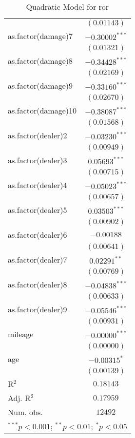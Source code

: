 \begin{table}
\begin{center}
\begin{tabular}{l c}
                    & $(0.01143)$      \\
as.factor(damage)7  & $-0.30002^{***}$ \\
                    & $(0.01321)$      \\
as.factor(damage)8  & $-0.34428^{***}$ \\
                    & $(0.02169)$      \\
as.factor(damage)9  & $-0.33160^{***}$ \\
                    & $(0.02670)$      \\
as.factor(damage)10 & $-0.38087^{***}$ \\
                    & $(0.01568)$      \\
as.factor(dealer)2  & $-0.03230^{***}$ \\
                    & $(0.00949)$      \\
as.factor(dealer)3  & $0.05693^{***}$  \\
                    & $(0.00715)$      \\
as.factor(dealer)4  & $-0.05023^{***}$ \\
                    & $(0.00657)$      \\
as.factor(dealer)5  & $0.03503^{***}$  \\
                    & $(0.00902)$      \\
as.factor(dealer)6  & $-0.00188$       \\
                    & $(0.00641)$      \\
as.factor(dealer)7  & $0.02291^{**}$   \\
                    & $(0.00769)$      \\
as.factor(dealer)8  & $-0.04838^{***}$ \\
                    & $(0.00633)$      \\
as.factor(dealer)9  & $-0.05546^{***}$ \\
                    & $(0.00931)$      \\
mileage             & $-0.00000^{***}$ \\
                    & $(0.00000)$      \\
age                 & $-0.00315^{*}$   \\
                    & $(0.00139)$      \\
\hline
R$^2$               & $0.18143$        \\
Adj. R$^2$          & $0.17959$        \\
Num. obs.           & $12492$          \\
\hline
\multicolumn{2}{l}{\scriptsize{$^{***}p<0.001$; $^{**}p<0.01$; $^{*}p<0.05$}}
\end{tabular}
\caption{Quadratic Model for  ror}
\label{tab:reg_sq_damage}
\end{center}
\end{table}
